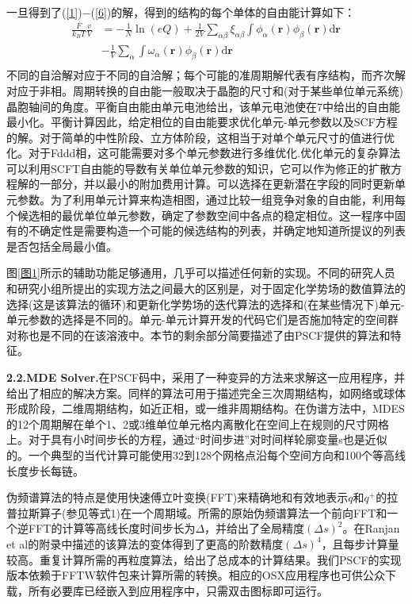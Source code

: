 \documentclass[12pt，a4paper]{article}
\numberwithin{equation}{section}
\begin{document}
一旦得到了(\ref{1})−(\ref{6})的解，得到的结构的每个单体的自由能计算如下：
\begin{equation}\label{7}
\begin{aligned}
\frac{F}{k_BT}\frac{v}{V} & =  -\frac{1}{N}\ln (eQ)+\frac{1}{2V}\sum _{\alpha \beta} \xi_{\alpha \beta}\int \phi_{\alpha}(\mathbf{r})\phi_{\beta}(\mathbf{r}) \mathrm{d}\mathbf{r}\\
& - \frac{1}{V}\sum _{\alpha} \int \omega_{\alpha}(\mathbf{r})\phi_{\beta}(\mathbf{r})\mathrm{d}\mathbf{r}\\
\end{aligned}
\end{equation}
不同的自洽解对应于不同的自洽解；每个可能的准周期解代表有序结构，而齐次解对应于非相。周期转换的自由能一般取决于晶胞的尺寸和(对于某些单位单元系统)晶胞轴间的角度。平衡自由能由单元电池给出，该单元电池使在7中给出的自由能最小化。平衡计算因此，给定相位的自由能要求优化单元-单元参数以及SCF方程的解。对于简单的中性阶段、立方体阶段，这相当于对单个单元尺寸的值进行优化。对于Fddd相，这可能需要对多个单元参数进行多维优化.优化单元的复杂算法可以利用SCFT自由能的导数有关单位单元参数的知识，它可以作为修正的扩散方程解的一部分，并以最小的附加费用计算。可以选择在更新潜在字段的同时更新单元参数。为了利用单元计算来构造相图，通过比较一组竞争对象的自由能，利用每个候选相的最优单位单元参数，确定了参数空间中各点的稳定相位。这一程序中固有的不确定性是需要构造一个可能的候选结构的列表，并确定地知道所提议的列表是否包括全局最小值。

图\ref{图1}所示的辅助功能足够通用，几乎可以描述任何新的实现。不同的研究人员和研究小组所提出的实现方法之间最大的区别是，对于固定化学势场的数值算法的选择(这是该算法的循环)和更新化学势场的迭代算法的选择和(在某些情况下)单元-单元参数的选择是不同的。单元-单元计算开发的代码它们是否施加特定的空间群对称也是不同的在该溶液中。本节的剩余部分简要描述了由PSCF提供的算法和特征。

\textbf{2.2.MDE Solver.}在PSCF码中，采用了一种变异的方法来求解这一应用程序，并给出了相应的解决方案。同样的算法可用于描述完全三次周期结构，如网络或球体形成阶段，二维周期结构，如近正相，或一维非周期结构。在伪谱方法中，MDES的12个周期解在单个1、2或3维单位单元格内离散化在空间上在规则的尺寸网格上。对于具有小时间步长的方程，通过“时间步进”对时间样轮廓变量s也是近似的。一个典型的当代计算可能使用32到128个网格点沿每个空间方向和100个等高线长度步长每链。

伪频谱算法的特点是使用快速傅立叶变换(FFT)来精确地和有效地表示$q$和$q^{+}$的拉普拉斯算子(参见等式1)在一个周期域。所需的原始伪频谱算法一个前向FFT和一个逆FFT的计算等高线长度时间步长为$\Delta$，并给出了全局精度$(\Delta s)^2$。在Ranjan et al的附录中描述的该算法的变体得到了更高的阶数精度$(\Delta s)^4$，且每步计算量较高。重复计算所需的再粒度算法，给出了总成本的计算结果。我们PSCF的实现版本依赖于FFTW软件包来计算所需的转换。相应的OSX应用程序也可供公众下载，所有必要库已经嵌入到应用程序中，只需双击图标即可运行。
\end{document}
